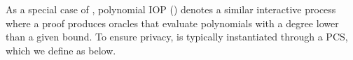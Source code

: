 \documentclass[letterpaper,twocolumn,10pt]{article}
\theoremstyle{definition}
\newtheorem{definition}{Definition}[section]
\newcommand{\mypara}[1]{\noindent\textbf{{#1: }}}
\begin{document}
	
	
		
		

As a special case of , polynomial IOP () denotes a similar interactive process where a proof produces oracles that evaluate polynomials with a degree lower than a given bound.
To ensure privacy,  is typically instantiated through a PCS, which we define as below.
\end{document}
